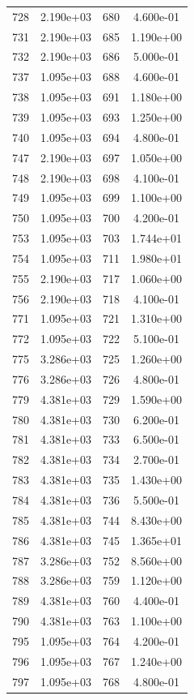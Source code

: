 \documentclass[12pt]{article}
\begin{document}
\begin{longtable}{@{}cccc@{}}
728 & 2.190e+03 & 680 & 4.600e-01 \\
731 & 2.190e+03 & 685 & 1.190e+00 \\
732 & 2.190e+03 & 686 & 5.000e-01 \\
737 & 1.095e+03 & 688 & 4.600e-01 \\
738 & 1.095e+03 & 691 & 1.180e+00 \\
739 & 1.095e+03 & 693 & 1.250e+00 \\
740 & 1.095e+03 & 694 & 4.800e-01 \\
747 & 2.190e+03 & 697 & 1.050e+00 \\
748 & 2.190e+03 & 698 & 4.100e-01 \\
749 & 1.095e+03 & 699 & 1.100e+00 \\
750 & 1.095e+03 & 700 & 4.200e-01 \\
753 & 1.095e+03 & 703 & 1.744e+01 \\
754 & 1.095e+03 & 711 & 1.980e+01 \\
755 & 2.190e+03 & 717 & 1.060e+00 \\
756 & 2.190e+03 & 718 & 4.100e-01 \\
771 & 1.095e+03 & 721 & 1.310e+00 \\
772 & 1.095e+03 & 722 & 5.100e-01 \\
775 & 3.286e+03 & 725 & 1.260e+00 \\
776 & 3.286e+03 & 726 & 4.800e-01 \\
779 & 4.381e+03 & 729 & 1.590e+00 \\
780 & 4.381e+03 & 730 & 6.200e-01 \\
781 & 4.381e+03 & 733 & 6.500e-01 \\
782 & 4.381e+03 & 734 & 2.700e-01 \\
783 & 4.381e+03 & 735 & 1.430e+00 \\
784 & 4.381e+03 & 736 & 5.500e-01 \\
785 & 4.381e+03 & 744 & 8.430e+00 \\
786 & 4.381e+03 & 745 & 1.365e+01 \\
787 & 3.286e+03 & 752 & 8.560e+00 \\
788 & 3.286e+03 & 759 & 1.120e+00 \\
789 & 4.381e+03 & 760 & 4.400e-01 \\
790 & 4.381e+03 & 763 & 1.100e+00 \\
795 & 1.095e+03 & 764 & 4.200e-01 \\
796 & 1.095e+03 & 767 & 1.240e+00 \\
797 & 1.095e+03 & 768 & 4.800e-01 \\

\end{longtable}
\end{document}
